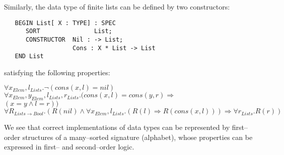 \documentclass[landscape, autoslides, light]{mmiss}
\newcommand{\ns}{\normalsize}
\begin{document}
\begin{Package}[Label={FSDPT}, Title={Formal Specification of Data and Process Types}, ShortTitle={FSDPT}, Authors={Horst Reichel}, Date={February 2003}, LevelOfDetail=Lecture, Language=en-GB]
\begin{Section}[Title={Introduction}, Label={section2}]
\begin{Paragraph}[Title={Basic Intuition}, Label=Paragraph9]

\end{Paragraph}
\begin{Paragraph}[Title={Basic Intuition}, Label=Paragraph10]

Similarly, the data type of finite lists can be defined by two
constructors: \vspace{8mm} \small
\begin{verbatim}
   BEGIN List[ X : TYPE] : SPEC
      SORT               List;
      CONSTRUCTOR  Nil : -> List;
                   Cons : X * List -> List
   END List
\end{verbatim}
\ns



\end{Paragraph}
\begin{Paragraph}[Title={Basic Intuition}, Label=Paragraph11]

satisfying the following properties:\vspace{8mm}
\begin{List}[ListType=enumeration]
    \ListItem  $\forall x_{Elem}, l_{Lists}. \neg( cons(x,l) = nil) $ \pause
    \ListItem  $\forall x_{Elem}, y_{Elem}, l_{Lists}, r_{Lists}.
   (cons(x,l) = cons(y,r) \Rightarrow $ \\
      $(x = y \wedge l = r)) $ \pause
    \ListItem $\forall R_{Lists \to Bool}.(R(nil) \wedge \forall x_{Elem}, l_{Lists}.
   (R(l) \Rightarrow R(cons(x,l))) \Rightarrow \forall r_{Lists} .
   R(r))$
\end{List}


\end{Paragraph}
\begin{Paragraph}[Title={Basic Intuition}, Label=Paragraph12]

We see that correct implementations of data types can be
represented by first--order structures of a many--sorted signature
(alphabet), whose properties can be expressed in first-- and
second--order logic.


\end{Paragraph}
\begin{Paragraph}[Title={Basic Intuition - Initiality}, Label=Paragraph13]


\end{Paragraph}
\end{Section}
\end{Package}
\end{document}

